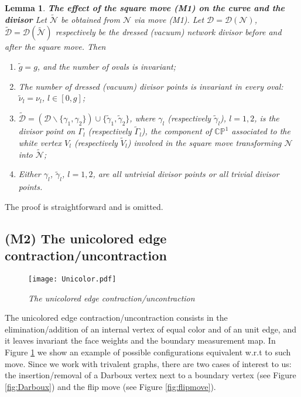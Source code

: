 \documentclass[11pt]{amsart}
\theoremstyle{plain}
\numberwithin{equation}{section}
\newtheorem{lemma}[theorem]{Lemma}
\begin{document}
\begin{lemma}\label{lemma:poles_move1}\textbf{The effect of the square move (M1) on the curve and the divisor} 
Let ${\tilde {\mathcal N}}$ be obtained from ${\mathcal N}$ via move (M1). Let ${\mathcal D} ={\mathcal D}({\mathcal N})$,  ${\tilde {\mathcal D}} ={\mathcal D}({\tilde {\mathcal N}})$ respectively  be the dressed (vacuum) network divisor before and after the square move.
Then
\begin{enumerate}
\item ${\tilde g}=g$, and the number of ovals is invariant;
\item The number of dressed (vacuum) divisor points is invariant in every oval: ${\tilde \nu}_{l} =\nu_{l}$, $l\in [0, g]$;
\item ${\tilde {\mathcal D}} = \left( {\mathcal D} \backslash \{ \gamma_1, \gamma_2 \} \right) \cup \{ {\tilde \gamma}_1, {\tilde \gamma}_2 \}$, where
$\gamma_l$ (respectively $\tilde\gamma_l$), $l=1,2$, is the divisor point on $\Gamma_l$ (respectively  $\tilde\Gamma_l$), the component of $\mathbb{CP}^1$ associated to the white vertex $V_l$ (respectively $\tilde V_l$) involved in the square move transforming ${\mathcal N}$ into $\tilde{\mathcal N}$;
\item Either $\gamma_l$, $\tilde\gamma_l$, $l=1,2$, are all untrivial divisor points or all trivial divisor points.
\end{enumerate}
\end{lemma}

The proof is straightforward and is omitted. 

\subsection{(M2) The unicolored edge contraction/uncontraction}\label{sec:flip}

\begin{figure}%
\texttt{[image: Unicolor.pdf]}
\vspace{-0.5 truecm}
\caption{\small{\sl The unicolored edge contraction/uncontraction }}
\label{fig:unicolor}
\end{figure}

The unicolored edge contraction/un\-con\-traction consists in the elimination/addition of an internal vertex of equal color and of an unit edge, and it leaves invariant the face weights and the boundary measurement map. In Figure \ref{fig:unicolor} we show an example of possible configurations equivalent w.r.t to such move.
Since we work with trivalent graphs, there are two cases of interest to us: the insertion/removal of a Darboux vertex next to a boundary vertex (see Figure \ref{fig:Darboux}) and the flip move (see Figure \ref{fig:flipmove}).
\end{document}
